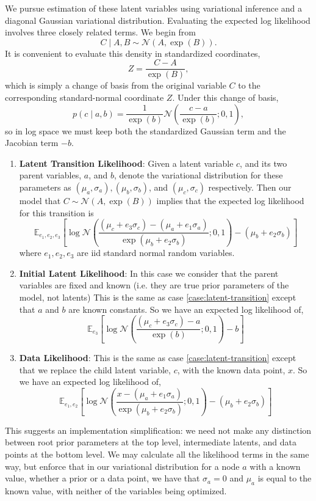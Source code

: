 We pursue estimation of these latent variables
using variational inference and a diagonal Gaussian
variational distribution. Evaluating the expected log likelihood
involves three closely related terms. We begin from
\[
C \mid A, B \sim \mathcal{N}(A, \exp(B)).
\]
It is convenient to evaluate this density in standardized coordinates,
\[
Z = \frac{C - A}{\exp(B)},
\]
which is simply a change of basis from the original variable $C$
to the corresponding standard-normal coordinate $Z$.
Under this change of basis,
\[
p(c \mid a, b)
= \frac{1}{\exp(b)} \mathcal{N}\left(
    \frac{c-a}{\exp(b)} ; 0, 1
\right),
\]
so in log space we must keep both the standardized Gaussian term
and the Jacobian term $-b$.
\begin{enumerate}
    \item \textbf{Latent Transition Likelihood}:
    \label{case:latent-transition}
    Given a latent variable $c$, and its two parent variables,
    $a$, and $b$, denote the variational distribution
    for these parameters as $(\mu_a, \sigma_a), (\mu_b, \sigma_b)$, and
    $(\mu_c, \sigma_c)$ respectively.
    Then our model that $C \sim \mathcal{N}(A, \exp(B))$ implies that
    the expected log likelihood for this transition is
    $$
    \mathbb{E}_{e_1,e_2,e_3} \left[
        \log \mathcal{N}\left(
            \frac{(\mu_c + e_3 \sigma_c) - (\mu_a + e_1 \sigma_a)}
            {\exp(\mu_b + e_2 \sigma_b)} ; 0, 1
        \right)
        - (\mu_b + e_2 \sigma_b)
    \right]
    $$
    where $e_1, e_2, e_3$ are iid standard normal random variables.
    \item \textbf{Initial Latent Likelihood}:
    In this case we consider that the parent variables are fixed and known
    (i.e. they are true prior parameters of the model, not latents)
    This is the same as case \ref{case:latent-transition}
    except that $a$ and $b$ are known constants. So we have
    an expected log likelihood of,
    $$
    \mathbb{E}_{e_3} \left[
        \log \mathcal{N}\left(
            \frac{(\mu_c + e_3 \sigma_c) - a}{\exp(b)} ; 0, 1
        \right)
        - b
    \right]
    $$
    \item \textbf{Data Likelihood}:
    This is the same as case \ref{case:latent-transition}
    except that we replace the child latent variable, $c$, with the known data point, $x$.
    So we have an expected log likelihood of,
    $$
    \mathbb{E}_{e_1,e_2} \left[
        \log \mathcal{N}\left(
            \frac{x - (\mu_a + e_1 \sigma_a)}{\exp(\mu_b + e_2 \sigma_b)} ; 0, 1
        \right)
        - (\mu_b + e_2 \sigma_b)
    \right]
    $$
\end{enumerate}
This suggests an implementation simplification: we need not make
any distinction between root prior parameters at the top level, intermediate latents,
and data points at the bottom level. 
We may calculate all the likelihood terms in the same way,
but enforce that in our variational distribution for a node $a$ with a known value,
whether a prior or a data point, we have that $\sigma_a = 0$
and $\mu_a$ is equal to the known value, with neither of the variables
being optimized.

